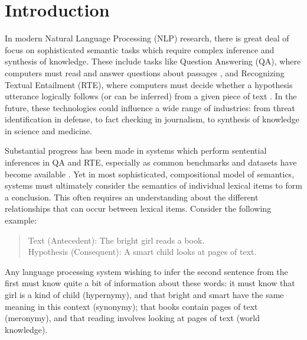 \chapter{Introduction}
\label{ch:intro}

In modern Natural Language Processing (NLP) research, there is great deal of
focus on sophisticated semantic tasks which require complex inference and
synthesis of knowledge. These include tasks like Question Answering (QA), where
computers must read and answer questions about passages
\cite{hirschman:2001:nle,allam:2012:ijrris,gupta:2012:ijca}, and Recognizing Textual Entailment
(RTE), where computers must decide whether a hypothesis utterance logically
follows (or can be inferred) from a given piece of text
\cite{dagan:2006:mlc,marelli:2014:semeval,bowman:2015:emnlp}. In the future,
these technologies could influence a wide range of industries: from threat
identification in defense, to fact checking in journalism, to
synthesis of knowledge in science and medicine.

Substantial progress has been made in systems which perform
sentential inferences in QA and RTE, especially as common benchmarks
and datasets have become available
\cite{dagan:2006:mlc,giampiccolo:2007:pascal,bentivogli:2009:tac,marelli:2014:semeval,bowman:2015:emnlp}.
Yet in most sophisticated, compositional model of semantics, systems must
ultimately consider the semantics of individual lexical items to form a
conclusion. This often requires an understanding about the different
relationships that can occur between lexical items. Consider the following
example:
\begin{quote}
  \label{ex:rte}
  Text (Antecedent): The bright girl reads a book.\\
  Hypothesis (Consequent): A smart child looks at pages of text.
\end{quote}
Any language processing system wishing to infer the second sentence from the
first must know quite a bit of information about these words: it must know that
girl is a kind of child (hypernymy), and that bright and smart have the same
meaning in this context (synonymy); that books contain pages of text
(meronymy), and that reading involves looking at pages of text (world knowledge).

